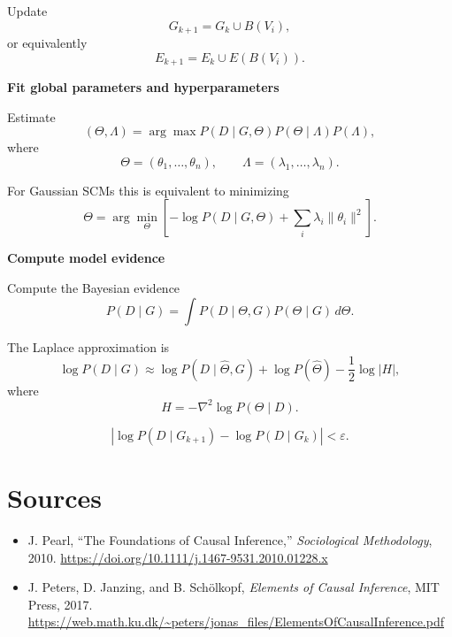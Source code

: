 \documentclass[11pt]{article}
\begin{document}
\begin{algorithm}[H]
\begin{algorithmic}[1]
Update
\[
G_{k+1}
=
G_k
\cup
B(V_i),
\]
or equivalently
\[
E_{k+1}
=
E_k
\cup
E(B(V_i)).
\]

\State \textbf{Fit global parameters and hyperparameters}

Estimate
\[
(\Theta,\Lambda)
=
\arg\max
P(D\mid G,\Theta)
P(\Theta\mid\Lambda)
P(\Lambda),
\]
where
\[
\Theta
=
(\theta_1,\ldots,\theta_n),
\qquad
\Lambda
=
(\lambda_1,\ldots,\lambda_n).
\]

For Gaussian SCMs this is equivalent to minimizing
\[
\Theta
=
\arg\min_{\Theta}
\left[
-\log
P(D\mid G,\Theta)
+
\sum_i
\lambda_i
\|\theta_i\|^2
\right].
\]

\State \textbf{Compute model evidence}

Compute the Bayesian evidence
\[
P(D\mid G)
=
\int
P(D\mid\Theta,G)
P(\Theta\mid G)
\,d\Theta.
\]

The Laplace approximation is
\[
\log P(D\mid G)
\approx
\log
P(D\mid\hat{\Theta},G)
+
\log
P(\hat{\Theta})
-
\frac12
\log|H|,
\]
where
\[
H
=
-\nabla^2
\log
P(\Theta\mid D).
\]

\Until
\[
\left|
\log P(D\mid G_{k+1})
-
\log P(D\mid G_k)
\right|
<
\varepsilon.
\]

\end{algorithmic}
\end{algorithm}

\section{Sources}
\begin{itemize}
  \item J. Pearl, ``The Foundations of Causal Inference,'' \emph{Sociological
  Methodology}, 2010. \url{https://doi.org/10.1111/j.1467-9531.2010.01228.x}
  \item J. Peters, D. Janzing, and B. Sch\"olkopf, \emph{Elements of Causal
  Inference}, MIT Press, 2017. \url{https://web.math.ku.dk/~peters/jonas_files/ElementsOfCausalInference.pdf}
\end{itemize}
\end{document}
